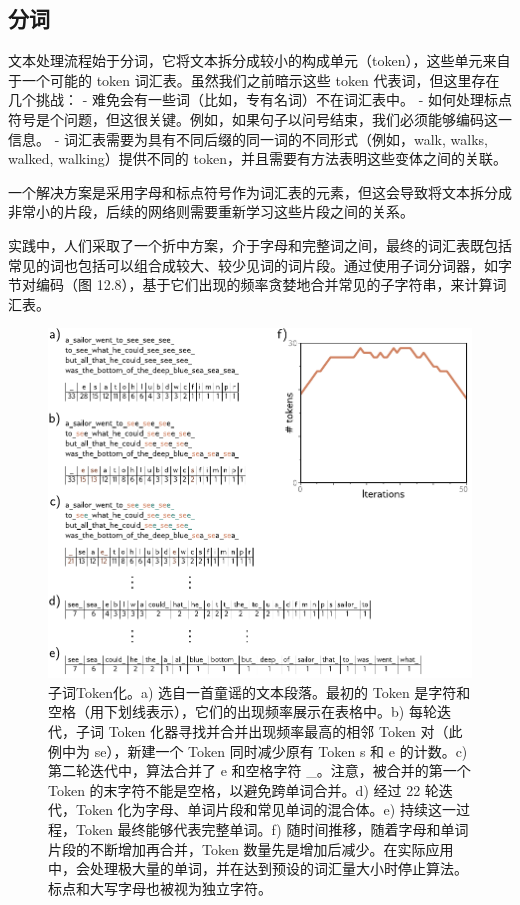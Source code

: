 \documentclass[lang=cn,newtx,10pt,scheme=chinese]{elegantbook}
\begin{document}
\subsection{分词}
文本处理流程始于分词，它将文本拆分成较小的构成单元（token），这些单元来自于一个可能的 token 词汇表。虽然我们之前暗示这些 token 代表词，但这里存在几个挑战：
- 难免会有一些词（比如，专有名词）不在词汇表中。
- 如何处理标点符号是个问题，但这很关键。例如，如果句子以问号结束，我们必须能够编码这一信息。
- 词汇表需要为具有不同后缀的同一词的不同形式（例如，walk, walks, walked, walking）提供不同的 token，并且需要有方法表明这些变体之间的关联。

一个解决方案是采用字母和标点符号作为词汇表的元素，但这会导致将文本拆分成非常小的片段，后续的网络则需要重新学习这些片段之间的关系。

实践中，人们采取了一个折中方案，介于字母和完整词之间，最终的词汇表既包括常见的词也包括可以组合成较大、较少见词的词片段。通过使用子词分词器，如字节对编码（图 12.8），基于它们出现的频率贪婪地合并常见的子字符串，来计算词汇表。

\begin{figure}[ht!]
\centering
\includegraphics[width=0.7\linewidth]{PDFFigures/UDLChap12PDF/TransformerBPE.pdf}
\caption{子词Token化。a) 选自一首童谣的文本段落。最初的 Token 是字符和空格（用下划线表示），它们的出现频率展示在表格中。b) 每轮迭代，子词 Token 化器寻找并合并出现频率最高的相邻 Token 对（此例中为 se），新建一个 Token 同时减少原有 Token s 和 e 的计数。c) 第二轮迭代中，算法合并了 e 和空格字符 \_。注意，被合并的第一个 Token 的末字符不能是空格，以避免跨单词合并。d) 经过 22 轮迭代，Token 化为字母、单词片段和常见单词的混合体。e) 持续这一过程，Token 最终能够代表完整单词。f) 随时间推移，随着字母和单词片段的不断增加再合并，Token 数量先是增加后减少。在实际应用中，会处理极大量的单词，并在达到预设的词汇量大小时停止算法。标点和大写字母也被视为独立字符。}
\end{figure}
\end{document}
